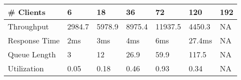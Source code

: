 \begin{tabular}{lllllll}
\hline
\# Clients & 6  & 18 & 36 & 72 & 120 & 192\\
\hline
Throughput & 2984.7 & 5978.9 & 8975.4 & 11937.5 & 4450.3 & NA\\
Response Time & 2ms & 3ms & 4ms & 6ms & 27.4ms & NA\\
Queue Length & 3 & 12 & 26.9 & 59.9 & 117.5 & NA\\
Utilization & 0.05 & 0.18 & 0.46 & 0.93 & 0.34 & NA\\
\hline
\end{tabular}